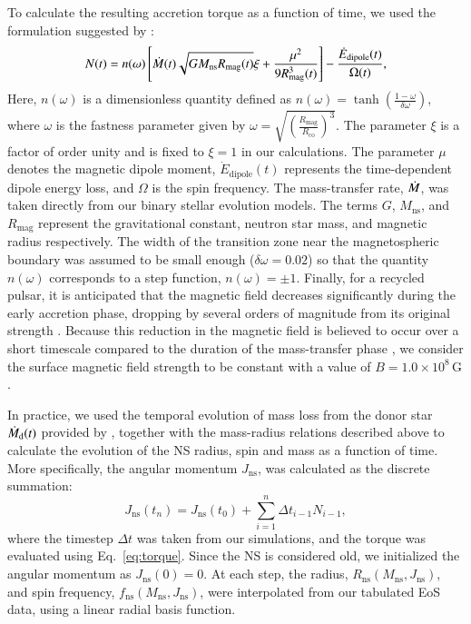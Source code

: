 \documentclass[main.tex]{subfiles}
\begin{document}
    To calculate the resulting accretion torque as a function of time, we used the formulation suggested by \cite{Tauris:sc2012}:
    \begin{equation}
        \label{eq:torque}
        N(t) = n(\omega) \left[\dot{M}(t) \sqrt{GM_\mathrm{ns}R_\mathrm{mag}(t)}\xi + \frac{\mu^2}{9R^3_\mathrm{mag}(t)}\right] - \frac{\dot{E}_\mathrm{dipole}(t)}{\Omega(t)},
    \end{equation}
    Here, $n(\omega)$ is a dimensionless quantity defined as $n(\omega) = \tanh \left( \frac{1 - \omega}{\delta \omega} \right)$, where $\omega$ is the fastness parameter given by $\omega = \sqrt{\left( \frac{R_\mathrm{mag}}{R_\mathrm{co}} \right)^3}$. The parameter $\xi$ is a factor of order unity and is fixed to $\xi=1$  in our calculations. The parameter $\mu$ denotes the magnetic dipole moment, $\dot{E}_\mathrm{dipole}(t)$ represents the time-dependent dipole energy loss, and $\Omega$ is the spin frequency.
    The mass-transfer rate, $\dot{M}$, was taken directly from our \mesa binary stellar evolution models. The terms $G$, $M_\mathrm{ns}$, and $R_\mathrm{mag}$ represent the gravitational constant, neutron star mass, and magnetic radius respectively.
    The width of the transition zone near the magnetospheric boundary was assumed to be small enough ($\delta \omega = 0.02$) so that the quantity $n(\omega)$ corresponds to a step function, $n(\omega) = \pm 1$.
    Finally, for a recycled pulsar, it is anticipated that the magnetic field decreases significantly during the early accretion phase, dropping by several orders of magnitude from its original strength \citep{1989Natur.342..656S}.
    Because this reduction in the magnetic field is believed to occur over a short timescale compared to the duration of the mass-transfer phase \citep{Bhattacharya:1991pre, 2017ApJ...835....4B}, we consider the surface magnetic field strength to be  constant with a value of $B = 1.0 \times 10^8\,\mathrm{G}$. 
    
    In practice, we used the temporal evolution of mass loss from the donor star $\dot{M}_{\rm d}(t)$ provided by \mesa, together with the mass-radius relations described above to calculate the evolution of the NS radius, spin and mass as a function of time. 
    More specifically, the angular momentum $J_\mathrm{ns}$, was calculated as the discrete summation: 
    \begin{equation}\label{eq:j_numerical_integration}
        J_\mathrm{ns}(t_n) = J_\mathrm{ns}(t_0) + \sum_{i=1}^n \Delta t_{i-1} N_{i-1},
    \end{equation}
    where the timestep $\Delta t$ was taken from our \mesa simulations, and the torque was evaluated using Eq.~\eqref{eq:torque}. Since the NS is considered old, we initialized the angular momentum as $J_\mathrm{ns}(0) = 0$.
     At each step, the radius, $R_\mathrm{ns}(M_\mathrm{ns}, J_\mathrm{ns})$, and spin frequency, $f_\mathrm{ns}(M_\mathrm{ns}, J_\mathrm{ns})$, were interpolated from our tabulated EoS data, using a linear radial basis function. 
    
\end{document}
